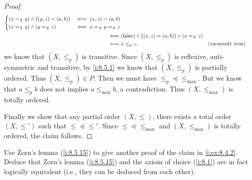 \begin{proof}
\begin{align*}
\begin{dcases}
             (x =_X y) \land \big((y, z) = (a, b)\big)                 & \iff (x, z) = (a, b) \\
             (x =_X y) \land (y =_X z)                                 & \iff x =_X y =_X z
           \end{dcases}                                 \\
    \iff & (\text{false}) \lor \big((x, z) = (a, b)\big) \lor (x =_X z)                                                     \\
    \iff & x \leq_p z,                                                                         &  & \text{(vacuously true)}
  \end{align*}
  we know that \((X, \leq_p)\) is transitive.
  Since \((X, \leq_p)\) is reflexive, anti-symmetric and transitive, by \cref{i:8.5.1} we know that \((X, \leq_p)\) is partially ordered.
  Thus \((X, \leq_p) \in P\).
  Then we must have \(\leq_p \preceq \leq_{\max}\).
  But we know that \(a \leq_p b\) does not implies \(a \leq_{\max} b\), a contradiction.
  Thus \((X, \leq_{\max})\) is totally ordered.

  Finally we show that any partial order \((X, \leq)\), there exists a total order \((X, \leq')\) such that \(\leq \preceq \leq'\).
  Since \(\leq \preceq \leq_{\max}\) and \((X, \leq_{\max})\) is totally ordered, the claim follows.
\end{proof}

\begin{ex}\label{i:ex:8.5.17}
  Use Zorn's lemma (\cref{i:8.5.15}) to give another proof of the claim in \cref{i:ex:8.4.2}.
  Deduce that Zorn's lemma (\cref{i:8.5.15}) and the axiom of choice (\cref{i:8.1}) are in fact logically equivalent
  (i.e., they can be deduced from each other).
\end{ex}

